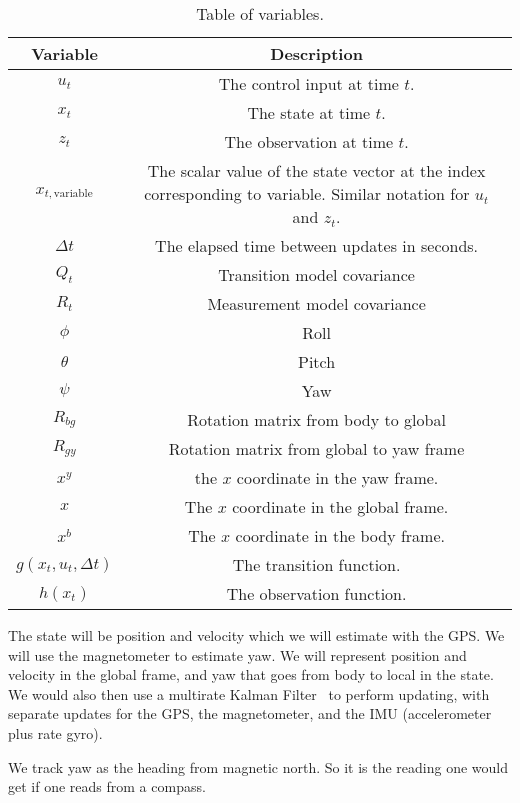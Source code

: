 \documentclass{article}
\begin{document}
\begin{table}
  \centering
  \begin{tabular}{cc}
    \toprule
    Variable & Description\\
    \midrule
    $u_t$ & The control input at time $t$.\\
    $x_t$ & The state at time $t$.\\
    $z_t$ & The observation at time $t$.\\
    $x_{t,\mbox{variable}}$ & \parbox{0.5\linewidth}{The scalar value of the state vector at the index corresponding to variable.  Similar notation for $u_t$ and $z_t$.}\\    
    $\Delta t$ & The elapsed time between updates in seconds.\\
    $Q_t$ & Transition model covariance\\
    $R_t$ & Measurement model covariance\\
    $\phi$ & Roll\\
    $\theta$ & Pitch\\
    $\psi$ & Yaw\\
    $R_{bg}$ & Rotation matrix from body to global\\
    $R_{gy}$ & Rotation matrix from global to yaw frame\\
    $x^y$& the $x$ coordinate in the yaw frame.\\
    $x$& The $x$ coordinate in the global frame.\\
    $x^b$& The $x$ coordinate in the body frame.\\
    $g(x_t, u_t, \Delta t)$ & The transition function. \\
    $h(x_t)$& The observation function.\\
    \bottomrule
  \end{tabular}
  \caption{Table of variables.}
\end{table}

The state will be position and velocity which we will estimate with the GPS.  We will use the magnetometer to estimate
yaw.  We will represent position and velocity in the global frame, and
yaw that goes from body to local in the state.  We would also then use
a multirate Kalman Filter~\citep{cristi2000multirate,
  quan2017introduction} to perform updating, with separate updates for
the GPS, the magnetometer, and the IMU (accelerometer plus rate gyro).


We track yaw as the heading from magnetic north.  So it is the reading
one would get if one reads from a compass.
\end{document}
